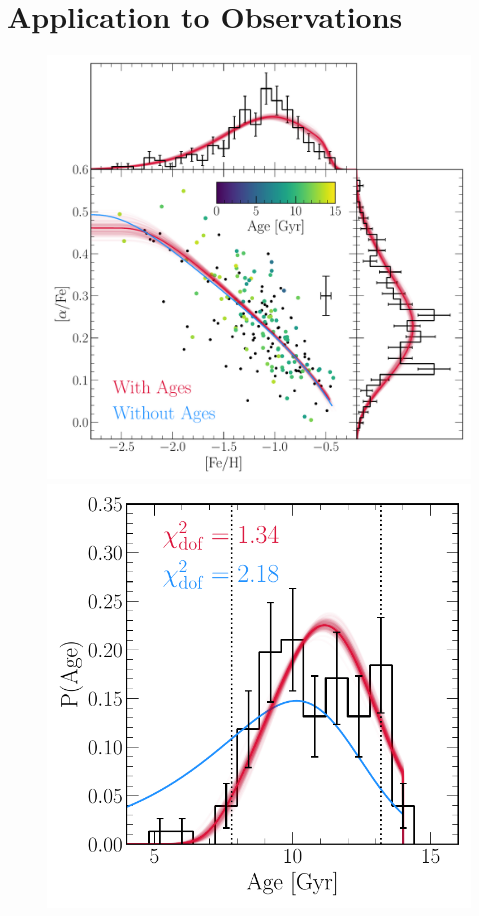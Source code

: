 \documentclass[ms.tex]{subfiles}
\begin{document}
\section{Application to Observations}
\label{sec:h3}

\begin{figure}
\centering
\includegraphics[scale = 0.65]{gsefit_afe_feh.pdf}
\includegraphics[scale = 0.54]{gsefit_agedist.pdf}

\end{figure}
\end{document}
